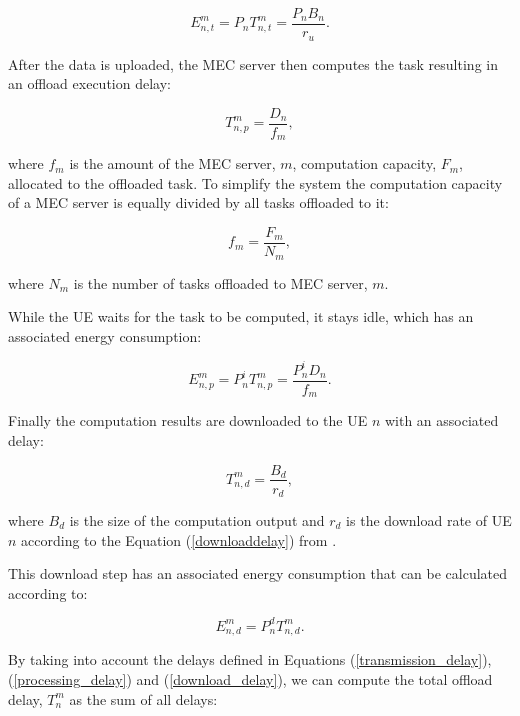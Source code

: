 \begin{equation} \label{transmission_energy}
    E_{n,t}^m = P_n T_{n,t}^m = \frac{P_n B_n}{r_u} .
\end{equation}

After the data is uploaded, the \acrshort{MEC} server then computes the task resulting in an offload execution delay:

\begin{equation} \label{processing_delay}
    T_{n,p}^m = \frac{D_n}{f_m} ,
\end{equation}

where $f_m$ is the amount of the \acrshort{MEC} server, $m$, computation capacity, $F_m$, allocated to the offloaded task. To simplify the system the computation capacity of a \acrshort{MEC} server is equally divided by all tasks offloaded to it:

\begin{equation}
    f_m = \frac{F_m}{N_m},
\end{equation}

where $N_m$ is the number of tasks offloaded to \acrshort{MEC} server, $m$.

While the \acrshort{UE} waits for the task to be computed, it stays idle, which has an associated energy consumption:

\begin{equation} \label{idle_energy}
    E_{n,p}^m = P_n^i T_{n,p}^m = \frac{P_n^i D_n}{f_m}.
\end{equation}

Finally the computation results are downloaded to the \acrshort{UE} $n$ with an associated delay:

\begin{equation} \label{download_delay}
    T_{n, d}^m = \frac{B_d}{r_d},
\end{equation}

where $B_d$ is the size of the computation output and $r_d$ is the download rate of \acrshort{UE} $n$ according to the Equation (\ref{downloaddelay}) from \cite{taskclass1}.

This download step has an associated energy consumption that can be calculated according to:

\begin{equation} \label{download_energy}
    E_{n, d}^m = P_n^d T_{n, d}^m .
\end{equation}

By taking into account the delays defined in Equations (\ref{transmission_delay}), (\ref{processing_delay}) and (\ref{download_delay}), we can compute the total offload delay, $T_n^m$ as the sum of all delays:


